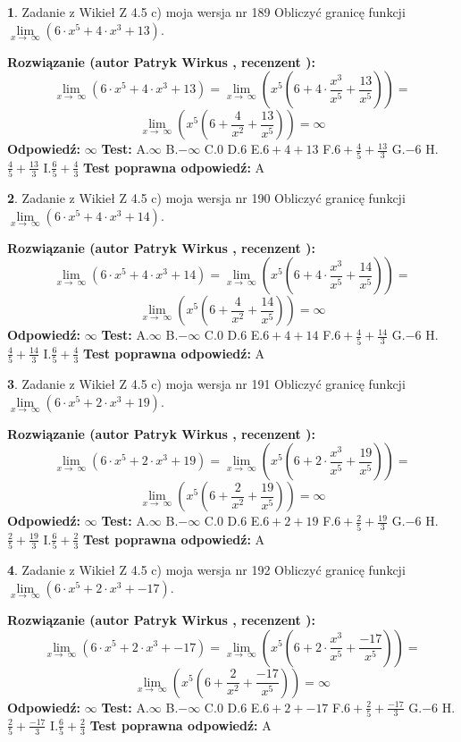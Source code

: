 \documentclass[12pt, a4paper]{article}
\theoremstyle{definition} %
\newtheorem{zad}{}
\newcommand{\zadStart}[1]{\begin{zad}#1\newline}
\newcommand{\zadStop}{\end{zad}}
\newcommand{\rozwStart}[2]{\noindent \textbf{Rozwiązanie (autor #1 , recenzent #2): }\newline}
\newcommand{\rozwStop}{\newline}
\newcommand{\odpStart}{\noindent \textbf{Odpowiedź:}\newline}
\newcommand{\odpStop}{\newline}
\newcommand{\testStart}{\noindent \textbf{Test:}\newline}
\newcommand{\testStop}{\newline}
\newcommand{\kluczStart}{\noindent \textbf{Test poprawna odpowiedź:}\newline}
\newcommand{\kluczStop}{\newline}
\begin{document}
\zadStart{Zadanie z Wikieł Z 4.5 c) moja wersja nr 189}
Obliczyć granicę funkcji  $\lim\limits_{x\to\ \infty}(6 \cdot x^{5}+4 \cdot x^{3}+13)$.
\zadStop
\rozwStart{Patryk Wirkus}{}
$$\lim\limits_{x\to\ \infty}(6 \cdot x^{5}+4 \cdot x^{3}+13) = \lim\limits_{x\to\ \infty}(x^{5}(6 +4 \cdot \frac{x^{3}}{x^{5}}+\frac{13}{x^{5}})) =$$ $$\lim\limits_{x\to\ \infty}(x^{5}(6 +\frac{4}{x^{2}}+\frac{13}{x^{5}})) =\infty$$
\rozwStop
\odpStart
$\infty$
\odpStop
\testStart
A.$\infty$ B.$-\infty$ C.$0$ D.$6$ E.$6 + 4 + 13$
F.$6+\frac{4}{5}+\frac{13}{3}$ G.$-6$
H.$\frac{4}{5}+\frac{13}{3}$
I.$\frac{6}{5}+\frac{4}{3}$
\testStop
\kluczStart
A
\kluczStop



\zadStart{Zadanie z Wikieł Z 4.5 c) moja wersja nr 190}
Obliczyć granicę funkcji  $\lim\limits_{x\to\ \infty}(6 \cdot x^{5}+4 \cdot x^{3}+14)$.
\zadStop
\rozwStart{Patryk Wirkus}{}
$$\lim\limits_{x\to\ \infty}(6 \cdot x^{5}+4 \cdot x^{3}+14) = \lim\limits_{x\to\ \infty}(x^{5}(6 +4 \cdot \frac{x^{3}}{x^{5}}+\frac{14}{x^{5}})) =$$ $$\lim\limits_{x\to\ \infty}(x^{5}(6 +\frac{4}{x^{2}}+\frac{14}{x^{5}})) =\infty$$
\rozwStop
\odpStart
$\infty$
\odpStop
\testStart
A.$\infty$ B.$-\infty$ C.$0$ D.$6$ E.$6 + 4 + 14$
F.$6+\frac{4}{5}+\frac{14}{3}$ G.$-6$
H.$\frac{4}{5}+\frac{14}{3}$
I.$\frac{6}{5}+\frac{4}{3}$
\testStop
\kluczStart
A
\kluczStop



\zadStart{Zadanie z Wikieł Z 4.5 c) moja wersja nr 191}
Obliczyć granicę funkcji  $\lim\limits_{x\to\ \infty}(6 \cdot x^{5}+2 \cdot x^{3}+19)$.
\zadStop
\rozwStart{Patryk Wirkus}{}
$$\lim\limits_{x\to\ \infty}(6 \cdot x^{5}+2 \cdot x^{3}+19) = \lim\limits_{x\to\ \infty}(x^{5}(6 +2 \cdot \frac{x^{3}}{x^{5}}+\frac{19}{x^{5}})) =$$ $$\lim\limits_{x\to\ \infty}(x^{5}(6 +\frac{2}{x^{2}}+\frac{19}{x^{5}})) =\infty$$
\rozwStop
\odpStart
$\infty$
\odpStop
\testStart
A.$\infty$ B.$-\infty$ C.$0$ D.$6$ E.$6 + 2 + 19$
F.$6+\frac{2}{5}+\frac{19}{3}$ G.$-6$
H.$\frac{2}{5}+\frac{19}{3}$
I.$\frac{6}{5}+\frac{2}{3}$
\testStop
\kluczStart
A
\kluczStop



\zadStart{Zadanie z Wikieł Z 4.5 c) moja wersja nr 192}
Obliczyć granicę funkcji  $\lim\limits_{x\to\ \infty}(6 \cdot x^{5}+2 \cdot x^{3}+-17)$.
\zadStop
\rozwStart{Patryk Wirkus}{}
$$\lim\limits_{x\to\ \infty}(6 \cdot x^{5}+2 \cdot x^{3}+-17) = \lim\limits_{x\to\ \infty}(x^{5}(6 +2 \cdot \frac{x^{3}}{x^{5}}+\frac{-17}{x^{5}})) =$$ $$\lim\limits_{x\to\ \infty}(x^{5}(6 +\frac{2}{x^{2}}+\frac{-17}{x^{5}})) =\infty$$
\rozwStop
\odpStart
$\infty$
\odpStop
\testStart
A.$\infty$ B.$-\infty$ C.$0$ D.$6$ E.$6 + 2 + -17$
F.$6+\frac{2}{5}+\frac{-17}{3}$ G.$-6$
H.$\frac{2}{5}+\frac{-17}{3}$
I.$\frac{6}{5}+\frac{2}{3}$
\testStop
\kluczStart
A
\kluczStop
\end{document}
